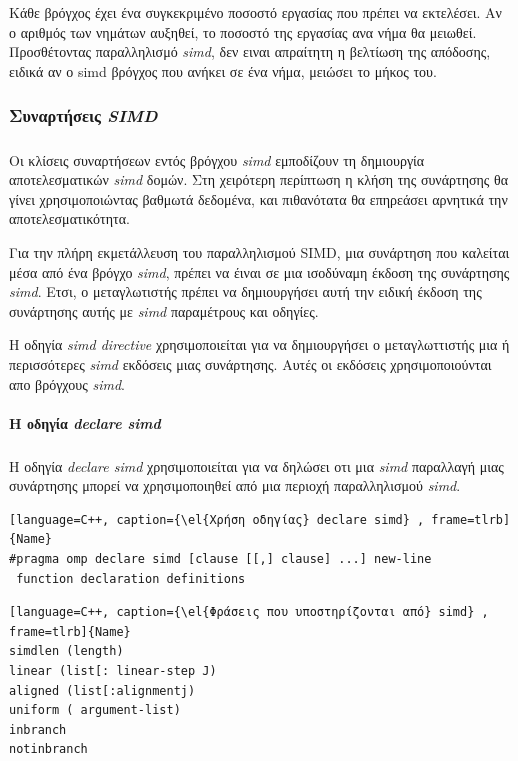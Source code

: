 \documentclass[12pt]{article}
\newcommand{\en}[1]{\foreignlanguage{english}{#1}}
\newcommand{\el}[1]{\selectlanguage{greek}{#1}\selectlanguage{english}}
\begin{document}
Κάθε βρόγχος έχει ένα συγκεκριμένο ποσοστό εργασίας που πρέπει να εκτελέσει. Αν ο αριθμός των νημάτων αυξηθεί, το ποσοστό της εργασίας ανα νήμα θα μειωθεί. Προσθέτοντας παραλληλισμό \emph{\en{simd}}, δεν ειναι απραίτητη η βελτίωση της απόδοσης, ειδικά αν ο simd βρόγχος που ανήκει σε ένα νήμα, μειώσει το μήκος του.
\clearpage{}
\subsubsection{Συναρτήσεις \emph{\en{SIMD}}}
\subparagraph{}
Οι κλίσεις συναρτήσεων εντός βρόγχου \emph{\en{simd}} εμποδίζουν τη δημιουργία αποτελεσματικών \emph{\en{simd}} δομών. Στη χειρότερη περίπτωση η κλήση της συνάρτησης θα γίνει χρησιμοποιώντας βαθμωτά δεδομένα, και πιθανότατα θα επηρεάσει αρνητικά την αποτελεσματικότητα.

Για την πλήρη εκμετάλλευση του παραλληλισμού SIMD, μια συνάρτηση που καλείται μέσα από ένα βρόγχο \emph{\en{simd}}, πρέπει να έιναι σε μια ισοδύναμη έκδοση  της συνάρτησης \emph{\en{simd}}. Ετσι, ο μεταγλωτιστής πρέπει να δημιουργήσει αυτή την ειδική έκδοση της συνάρτησης αυτής με \emph{\en{simd}} παραμέτρους και οδηγίες.

Η οδηγία \emph{\en{simd directive}} χρησιμοποιείται για να δημιουργήσει ο μεταγλωττιστής μια ή περισσότερες \emph{\en{simd}} εκδόσεις μιας συνάρτησης. Αυτές οι εκδόσεις χρησιμοποιούνται απο βρόγχους \emph{\en{simd}}.



\paragraph{H οδηγία \emph{\en{declare simd}}}
\subparagraph{}
Η οδηγία \emph{\en{declare simd}} χρησιμοποιείται για να δηλώσει οτι μια \emph{\en{simd}} παραλλαγή μιας συνάρτησης μπορεί να χρησιμοποιηθεί από μια περιοχή παραλληλισμού \emph{\en{simd}}.

\begin{lstlisting}[language=C++, caption={\el{Χρήση οδηγίας} declare simd} , frame=tlrb]{Name}
#pragma omp declare simd [clause [[,] clause] ...] new-line
 function declaration definitions
\end{lstlisting}

\begin{lstlisting}[language=C++, caption={\el{Φράσεις που υποστηρίζονται από} simd} , frame=tlrb]{Name}
simdlen (length)
linear (list[: linear-step J)
aligned (list[:alignmentj)
uniform ( argument-list)
inbranch
notinbranch
\end{lstlisting}
\end{document}
